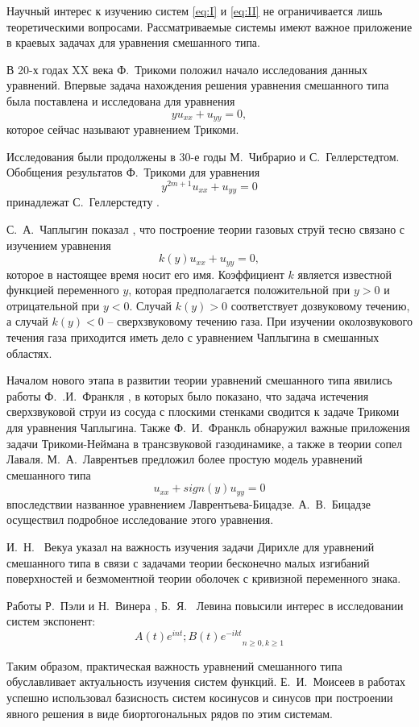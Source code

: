 \documentclass[oneside, final, 14pt]{extreport}
\begin{document}
Научный интерес к изучению систем \eqref{eq:I} и \eqref{eq:II} не ограничивается лишь 
теоретическими вопросами. Рассматриваемые системы имеют важное 
приложение в краевых задачах для уравнения смешанного типа.

В 20-х годах XX века Ф.~Трикоми \cite{trikomi} положил начало исследования данных уравнений. 
Впервые задача нахождения решения уравнения смешанного типа была поставлена и исследована для уравнения
$$yu_{xx} + u_{yy} = 0,$$
которое сейчас называют уравнением Трикоми.

Исследования были продолжены в 30-е годы М.~Чибрарио и С.~Геллерстедтом. 
Обобщения результатов Ф.~Трикоми для уравнения
$$y^{2m+1}u_{xx} + u_{yy} = 0$$
принадлежат С.~Геллерстедту \cite{gellerstedt}.

С.~А.~Чаплыгин показал \cite{chaplygin}, что построение теории газовых струй тесно
связано с изучением уравнения
$$k(y)u_{xx} + u_{yy} = 0,$$
которое в настоящее время носит его имя. Коэффициент $k$ является
известной функцией переменного $y$, которая предполагается положительной
при $y > 0$ и отрицательной при $y < 0$. Случай $k(y) > 0$ соответствует
дозвуковому течению, а случай $k(y) < 0$ – сверхзвуковому течению газа.
При изучении околозвукового течения газа приходится иметь дело с
уравнением Чаплыгина в смешанных областях.

Началом нового этапа в развитии теории уравнений смешанного типа
явились работы Ф.~.И.~Франкля \cite{frankl-laval, frankl-eq}, в которых было показано, что задача
истечения сверхзвуковой струи из сосуда с плоскими стенками сводится к
задаче Трикоми для уравнения Чаплыгина. Также Ф.~И.~Франкль обнаружил важные приложения задачи Трикоми-Неймана в трансзвуковой
газодинамике, а также в теории сопел Лаваля. М.~А.~Лаврентьев предложил \cite{lavrentiev-bitsadze} более
простую модель уравнений смешанного типа
$$u_{xx} + sign(y) u_{yy} = 0$$
впоследствии названное уравнением Лаврентьева-Бицадзе. А.~В.~Бицадзе 
осуществил подробное исследование этого уравнения.

И.~Н.~ Векуа указал \cite{vekua} на важность изучения задачи Дирихле для уравнений
смешанного типа в связи с задачами теории бесконечно малых изгибаний 
поверхностей и безмоментной теории оболочек с кривизной переменного
знака. 

Работы Р.~Пэли и Н.~Винера \cite{paley-wiener}, Б.~Я.~ Левина \cite{levin} повысили интерес в исследовании 
систем экспонент:
$${A(t)e^{int}; B(t)e^{-ikt}}_{n \geqslant 0, k \geqslant 1}$$

Таким образом, практическая важность уравнений смешанного типа обуславливает 
актуальность изучения систем функций. Е.~И.~Моисеев в работах \cite{moiseev-1990, moiseev-1996} успешно
использовал базисность систем косинусов и синусов при построении явного решения в виде
биортогональных рядов по этим системам. 
\end{document}
